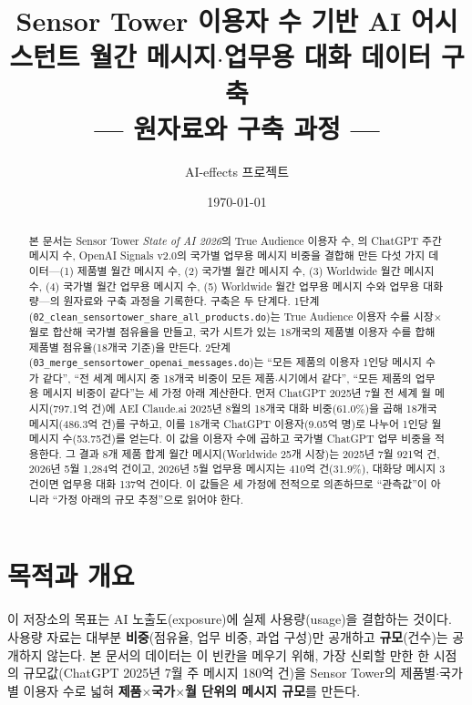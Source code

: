 \documentclass[11pt]{article}
\title{Sensor Tower 이용자 수 기반 AI 어시스턴트 월간 메시지$\cdot$업무용 대화 데이터 구축\\[2mm]
\large --- 원자료와 구축 과정 ---}
\author{AI-effects 프로젝트}
\date{\today}
\begin{document}
\maketitle

\begin{abstract}
\noindent 본 문서는 Sensor Tower \textit{State of AI 2026}\parencite{sensortower-2026-state-of-ai}의 True Audience 이용자 수, \textcite{chatterji-2025-how-people-use-chatgpt}의 ChatGPT 주간 메시지 수, OpenAI Signals v2.0\parencite{openai-2026-signals-v2}의 국가별 업무용 메시지 비중을 결합해 만든 다섯 가지 데이터---(1) 제품별 월간 메시지 수, (2) 국가별 월간 메시지 수, (3) Worldwide 월간 메시지 수, (4) 국가별 월간 업무용 메시지 수, (5) Worldwide 월간 업무용 메시지 수와 업무용 대화량---의 원자료와 구축 과정을 기록한다. 구축은 두 단계다. 1단계(\texttt{02\_clean\_sensortower\_share\_all\_products.do})는 True Audience 이용자 수를 시장$\times$월로 합산해 국가별 점유율을 만들고, 국가 시트가 있는 18개국의 제품별 이용자 수를 합해 제품별 점유율(18개국 기준)을 만든다. 2단계(\texttt{03\_merge\_sensortower\_openai\_messages.do})는 ``모든 제품의 이용자 1인당 메시지 수가 같다'', ``전 세계 메시지 중 18개국 비중이 모든 제품$\cdot$시기에서 같다'', ``모든 제품의 업무용 메시지 비중이 같다''는 세 가정 아래 계산한다. 먼저 ChatGPT 2025년 7월 전 세계 월 메시지(797.1억 건)에 AEI Claude.ai 2025년 8월의 18개국 대화 비중(61.0\%)을 곱해 18개국 메시지(486.3억 건)를 구하고, 이를 18개국 ChatGPT 이용자(9.05억 명)로 나누어 1인당 월 메시지 수(53.75건)를 얻는다. 이 값을 이용자 수에 곱하고 국가별 ChatGPT 업무 비중을 적용한다. 그 결과 8개 제품 합계 월간 메시지(Worldwide 25개 시장)는 2025년 7월 921억 건, 2026년 5월 1,284억 건이고, 2026년 5월 업무용 메시지는 410억 건(31.9\%), 대화당 메시지 3건이면 업무용 대화 137억 건이다. 이 값들은 세 가정에 전적으로 의존하므로 ``관측값''이 아니라 ``가정 아래의 규모 추정''으로 읽어야 한다.
\end{abstract}

\tableofcontents

\section{목적과 개요}

이 저장소의 목표는 AI 노출도(exposure)에 실제 사용량(usage)을 결합하는 것이다. 사용량 자료는 대부분 \textbf{비중}(점유율, 업무 비중, 과업 구성)만 공개하고 \textbf{규모}(건수)는 공개하지 않는다. 본 문서의 데이터는 이 빈칸을 메우기 위해, 가장 신뢰할 만한 한 시점의 규모값(ChatGPT 2025년 7월 주 메시지 180억 건)을 Sensor Tower의 제품별$\cdot$국가별 이용자 수로 넓혀 \textbf{제품$\times$국가$\times$월 단위의 메시지 규모}를 만든다.
\end{document}
